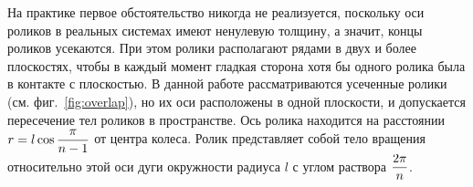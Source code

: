 На практике первое обстоятельство никогда не реализуется, поскольку оси роликов в реальных системах имеют ненулевую толщину, а значит, концы роликов усекаются. При этом ролики располагают рядами в двух и более плоскостях, чтобы в каждый момент гладкая сторона хотя бы одного ролика была в контакте с плоскостью. В данной работе рассматриваются усеченные ролики (см. фиг.~\ref{fig:overlap}), но их оси расположены в одной плоскости, и допускается пересечение тел роликов в пространстве. Ось ролика находится на расстоянии $r = l\cos\displaystyle\frac{\displaystyle \pi}{\displaystyle n-1}$ от центра колеса. Ролик представляет собой тело вращения относительно этой оси дуги окружности радиуса $l$ с углом раствора $\displaystyle\frac{\displaystyle 2\pi}{\displaystyle n}$.